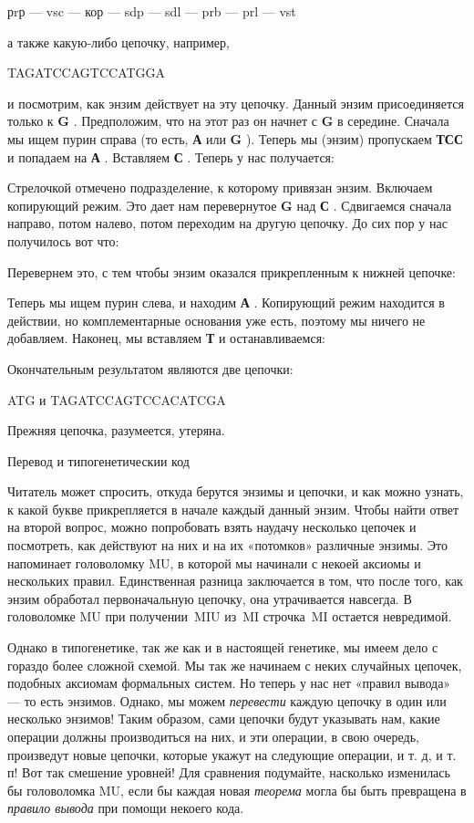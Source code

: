 рrр --- vsc --- кор --- sdp --- sdl --- prb --- prl --- vst

а также какую-либо цепочку, например,

TAGATCCAGTCCATGGA

и посмотрим, как энзим действует на эту цепочку. Данный энзим присоединяется только к \textbf{G} . Предположим, что на этот раз он начнет с \textbf{G} в середине. Сначала мы ищем пурин справа (то есть, \textbf{А} или \textbf{G} ). Теперь мы (энзим) пропускаем \textbf{ТСС} и попадаем на \textbf{А} . Вставляем \textbf{С} . Теперь у нас получается:

Стрелочкой отмечено подразделение, к которому привязан энзим. Включаем копирующий режим. Это дает нам перевернутое \textbf{G} над \textbf{С} . Сдвигаемся сначала направо, потом налево, потом переходим на другую цепочку. До сих пор у нас получилось вот что:

Перевернем это, с тем чтобы энзим оказался прикрепленным к нижней цепочке:

Теперь мы ищем пурин слева, и находим \textbf{А} . Копирующий режим находится в действии, но комплементарные основания уже есть, поэтому мы ничего не добавляем. Наконец, мы вставляем \textbf{Т} и останавливаемся:

Окончательным результатом являются две цепочки:

ATG и TAGATCCAGTCCACATCGA

Прежняя цепочка, разумеется, утеряна.

Перевод и типогенетическии код

Читатель может спросить, откуда берутся энзимы и цепочки, и как можно узнать, к какой букве прикрепляется в начале каждый данный энзим. Чтобы найти ответ на второй вопрос, можно попробовать взять наудачу несколько цепочек и посмотреть, как действуют на них и на их «потомков» различные энзимы. Это напоминает головоломку MU, в которой мы начинали с некоей аксиомы и нескольких правил. Единственная разница заключается в том, что после того, как энзим обработал первоначальную цепочку, она утрачивается навсегда. В головоломке MU при получении~MIU из~MI строчка~MI остается невредимой.

Однако в типогенетике, так же как и в настоящей генетике, мы имеем дело с гораздо более сложной схемой. Мы так же начинаем с неких случайных цепочек, подобных аксиомам формальных систем. Но теперь у нас нет «правил вывода» --- то есть энзимов. Однако, мы можем \emph{перевести} каждую цепочку в один или несколько энзимов! Таким образом, сами цепочки будут указывать нам, какие операции должны производиться на них, и эти операции, в свою очередь, произведут новые цепочки, которые укажут на следующие операции, и т. д, и т. п! Вот так смешение уровней! Для сравнения подумайте, насколько изменилась бы головоломка MU, если бы каждая новая \emph{теорема} могла бы быть превращена в \emph{правило вывода} при помощи некоего кода.

